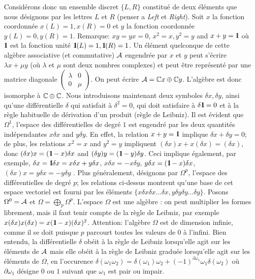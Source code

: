 	
	Consid\'erons donc un ensemble discret $\{L,R\}$ constitu\'e de deux \'el\'ements
	que nous d\'esignons par les lettres $L$ et $R$ (penser a {\it Left} 
	et {\it Right}). Soit $x$ la fonction coordonn\'ee $x(L)  =  1,
x(R)  =  0$ et  $y$ la fonction coordonn\'ee $y(L)  =  0, y(R)
 =  1$. Remarque:  $xy=yx=0$, $x^2=x, y^2=y$ and $x + y = \mbox{\rm 1}\hskip-3pt \mbox{\rm l}$
o\`u $\mbox{\rm 1}\hskip-3pt \mbox{\rm l}$ est la fonction unit\'e $\mbox{\rm 1}\hskip-3pt \mbox{\rm l}(L)=1, \mbox{\rm 1}\hskip-3pt \mbox{\rm l}(R)=1$. Un \'el\'ement quelconque 
de cette alg\`ebre associative (et commutative)  ${\cal A}$ engendr\'ee 
par
$x$ et $y$ peut s'\'ecrire $\lambda x + \mu y$ (o\`u $\lambda$ et
$\mu$ sont deux nombres complexes) et peut \^etre repr\'esent\'e par une 
matrice diagonale $\begin{pmatrix} \lambda & 0 \\ 0 & \mu  \end{pmatrix}$. 
On peut \'ecrire ${\cal A} = \mathbb{C} x \oplus \mathbb{C} y$. L'alg\`ebre est donc isomorphe \`a $\mathbb{C} \oplus \mathbb{C}$. 
Nous introduisons maintenant deux symboles $\delta x , \delta y$, 
ainsi qu'une diff\'erentielle $\delta$ qui 
satisfait \`a $\delta^2=0$, qui doit satisfaire \`a
$\delta \mbox{\rm 1}\hskip-3pt \mbox{\rm l} = 0$ et \`a la r\`egle habituelle de d\'erivation d'un 
produit (r\`egle de Leibniz).
Il est \'evident que $\Omega^1$, l'espace des 
diff\'erentielles de degr\'e $1$ est engendr\'e par les deux quantit\'es 
ind\'ependantes $x\delta x$ and $y\delta y$. En effet, la relation $x+y=\mbox{\rm 1}\hskip-3pt \mbox{\rm l}$
implique $\delta x + \delta y = 0$; de plus, les relations $x^2=x$ and $y^2=y$
impliquent $(\delta x)x+x(\delta x) = (\delta x)$, donc $(\delta x) x
= (\mbox{\rm 1}\hskip-3pt \mbox{\rm l}-x) \delta x$ and $(\delta y) y = (\mbox{\rm 1}\hskip-3pt \mbox{\rm l}-y) \delta y$. Ceci implique 
\'egalement, par exemple, $\delta x = \mbox{\rm 1}\hskip-3pt \mbox{\rm l} \delta x = x \delta x + y \delta x$,
$x \delta x = - x \delta y$, $y \delta x = (\mbox{\rm 1}\hskip-3pt \mbox{\rm l}-x) \delta x$, $(\delta
x)x = y\delta x = - y \delta y$ \etc. Plus g\'en\'eralement, d\'esignons par
$\Omega^p$, l'espace des diff\'erentielles de degr\'e $p$; les relations 
ci-dessus montrent qu'une base de cet espace vectoriel est fourni par 
les \'el\'ements
$\{x\delta x\delta x\ldots\delta x,y\delta y\delta y\ldots\delta y 
\}$. Posons $\Omega^0 = {\cal A} $ et $\Omega = \bigoplus_p \Omega^p
$. L'espace $\Omega$ est une alg\`ebre : on peut multiplier les formes 
librement, mais il faut tenir compte de la r\`egle de Leibniz, par 
exemple $x(\delta x) x(\delta x) = x(\mbox{\rm 1}\hskip-3pt \mbox{\rm l}-x)(\delta x)^2$. 
Attention: l'alg\`ebre $\Omega$ est de dimension infinie, comme il se 
doit puisque $p$ parcourt toutes les valeurs de $0$ \`a l'infini.
Bien entendu, la diff\'erentielle $\delta$ ob\'eit \`a la r\`egle de 
Leibniz lorsqu'elle agit sur les \'el\'ements de ${\cal A}$ mais elle ob\'eit \`a la r\`egle de 
Leibniz gradu\'ee lorsqu'elle agit sur les \'el\'ements de $\Omega$, en 
l'occurence
$\delta(\omega_1 \omega_2) = \delta(\omega_1) \omega_2 +
(-1)^{\partial \omega_1} \omega_1 \delta(\omega_2)$ o\`u ${\partial
\omega_1}$ d\'esigne $0$ ou $1$ suivant que $\omega_1$ est pair ou impair.\par

